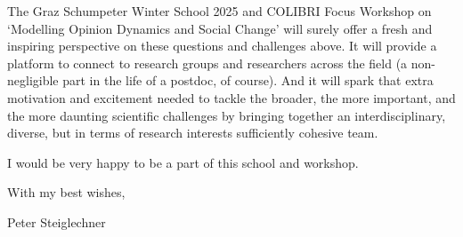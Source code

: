 The Graz Schumpeter Winter School 2025 and COLIBRI Focus Workshop on `Modelling Opinion Dynamics and Social Change' will surely offer a fresh and inspiring perspective on these questions and challenges above. It will provide a platform to connect to research groups and researchers across the field (a non-negligible part in the life of a postdoc, of course). And it will spark that extra motivation and excitement needed to tackle the broader, the more important, and the more daunting scientific challenges by bringing together an interdisciplinary, diverse, but in terms of research interests sufficiently cohesive team. 

I would be very happy to be a part of this school and workshop.

With my best wishes, 

Peter Steiglechner

